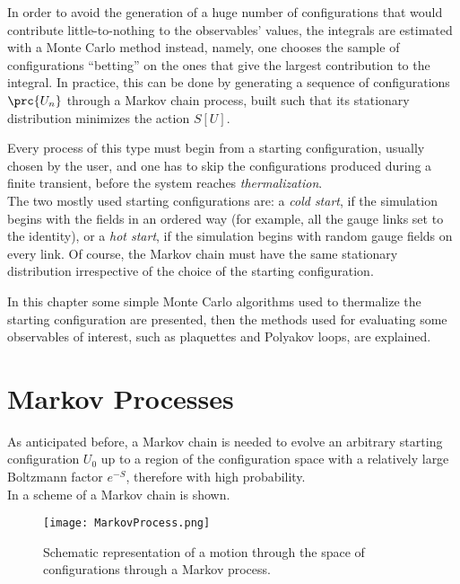 In order to avoid the generation of a huge number of configurations that would contribute little-to-nothing to the observables' values, the integrals are estimated with a Monte Carlo method instead, namely, one chooses the sample of configurations ``betting'' on the ones that give the largest contribution to the integral.
In practice, this can be done by generating a sequence of configurations $\prc{U_n}$ through a Markov chain process, built such that its stationary distribution minimizes the action $S[U]$.

Every process of this type must begin from a starting configuration, usually chosen by the user, and one has to skip the configurations produced during a finite transient, before the system reaches \emph{thermalization}.\\
The two mostly used starting configurations are: a \emph{cold start}, if the simulation begins with the fields in an ordered way (for example, all the gauge links set to the identity), or a \emph{hot start}, if the simulation begins with random gauge fields on every link.
Of course, the Markov chain must have the same stationary distribution irrespective of the choice of the starting configuration.

In this chapter some simple Monte Carlo algorithms used to thermalize the starting configuration are presented, then the methods used for evaluating some observables of interest, such as plaquettes and Polyakov loops, are explained.

\section{Markov Processes}
As anticipated before, a Markov chain is needed to evolve an arbitrary starting configuration $U_0$ up to a region of the configuration space with a relatively large Boltzmann factor $e^{-S}$, therefore with high probability.\\
In  a scheme of a Markov chain is shown.
\begin{figure}[!htbp]
    \centering
    \texttt{[image: MarkovProcess.png]}
    \caption{Schematic representation of a motion through the space of configurations through a Markov process.}
    \label{2F:MarkovProcess}
\end{figure}

